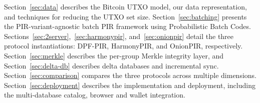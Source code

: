 Section~\ref{sec:data} describes the Bitcoin UTXO model, our data representation, and techniques for reducing the UTXO set size. Section~\ref{sec:batching} presents the PIR-variant-agnostic batch PIR framework using Probabilistic Batch Codes. Sections~\ref{sec:2server},~\ref{sec:harmonypir}, and~\ref{sec:onionpir} detail the three protocol instantiations: DPF-PIR, HarmonyPIR, and OnionPIR, respectively. Section~\ref{sec:merkle} describes the per-group Merkle integrity layer, and Section~\ref{sec:delta-db} describes delta databases and incremental sync. Section~\ref{sec:comparison} compares the three protocols across multiple dimensions. Section~\ref{sec:deployment} describes the implementation and deployment, including the multi-database catalog, browser and wallet integration.
